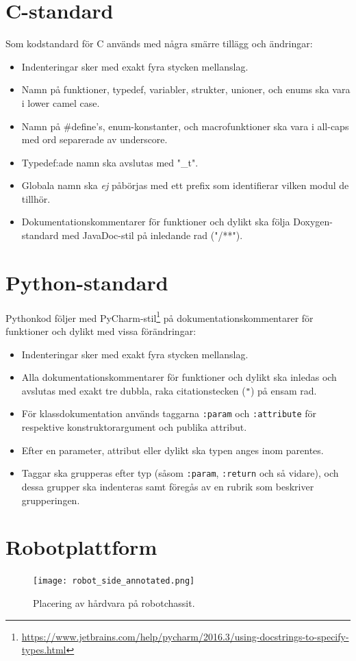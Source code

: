 \documentclass[a4paper,11pt]{article}
\begin{document}
\begin{appendices}
\clearpage
\section{C-standard} \label{app:cstandard}
Som kodstandard för C används \cite{cstandard} med några smärre tillägg och ändringar:

\begin{itemize}
    \item Indenteringar sker med exakt fyra stycken mellanslag.
    \item Namn på funktioner, typedef, variabler, strukter, unioner, och enums ska vara i lower camel case.
    \item Namn på \#define's, enum-konstanter, och macrofunktioner ska vara i all-caps med ord separerade av underscore.
    \item Typedef:ade namn ska avslutas med "\_t".
    \item Globala namn ska \textit{ej} påbörjas med ett prefix som identifierar vilken modul de tillhör.
    \item Dokumentationskommentarer för funktioner och dylikt ska följa Doxygen-standard med JavaDoc-stil på inledande rad ("/**").
\end{itemize}

\clearpage
\section{Python-standard} \label{app:pythonstandard}
Pythonkod följer \cite{pep8} med PyCharm-stil\footnote{\url{https://www.jetbrains.com/help/pycharm/2016.3/using-docstrings-to-specify-types.html}} på dokumentationskommentarer för funktioner och dylikt med vissa förändringar:

\begin{itemize}
    \item Indenteringar sker med exakt fyra stycken mellanslag.
    \item Alla dokumentationskommentarer för funktioner och dylikt ska inledas och avslutas med exakt tre dubbla, raka citationstecken (\texttt{"}) på ensam rad.
    \item För klassdokumentation används taggarna \texttt{:param} och \texttt{:attribute} för respektive konstruktorargument och publika attribut.
    \item Efter en parameter, attribut eller dylikt ska typen anges inom parentes.
    \item Taggar ska grupperas efter typ (såsom \texttt{:param}, \texttt{:return} och så vidare), och dessa grupper ska indenteras samt föregås av en rubrik som beskriver grupperingen.
\end{itemize}

\clearpage
\section{Robotplattform}
\label{app:placement}
\begin{figure}[h!]
    \centering
    \texttt{[image: robot\_side\_annotated.png]}
    \caption{Placering av hårdvara på robotchassit.}
    \label{fig:placement}
\end{figure}
\end{appendices}
\end{document}
